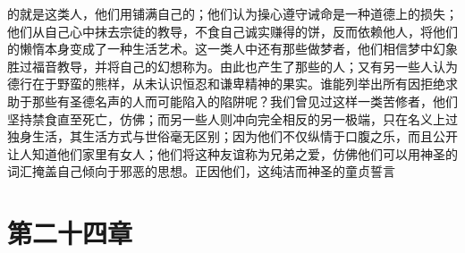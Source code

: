 的就是这类人，他们用铺满自己的；他们认为操心遵守诫命是一种道德上的损失；他们从自己心中抹去宗徒的教导，不食自己诚实赚得的饼，反而依赖他人，将他们的懒惰本身变成了一种生活艺术。这一类人中还有那些做梦者，他们相信梦中幻象胜过福音教导，并将自己的幻想称为。由此也产生了那些的人；又有另一些人认为德行在于野蛮的熊样，从未认识恒忍和谦卑精神的果实。谁能列举出所有因拒绝求助于那些有圣德名声的人而可能陷入的陷阱呢？我们曾见过这样一类苦修者，他们坚持禁食直至死亡，仿佛；而另一些人则冲向完全相反的另一极端，只在名义上过独身生活，其生活方式与世俗毫无区别；因为他们不仅纵情于口腹之乐，而且公开让人知道他们家里有女人；他们将这种友谊称为兄弟之爱，仿佛他们可以用神圣的词汇掩盖自己倾向于邪恶的思想。正因他们，这纯洁而神圣的童贞誓言\par


\section{第二十四章}

